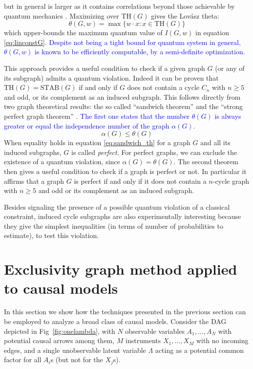 \documentclass[letterpaper]{article}
\newcommand{\STAB}{\mathrm{STAB}}
\renewcommand{\TH}{\mathrm{TH}}
\begin{document}
but in general is larger as it contains correlations beyond those achievable by quantum
mechanics \cite{almostquantum2015}.
Maximizing over $\TH(G)$ gives the Lovász theta:
\begin{equation}
    \theta(G,w) = \max \{w\cdot x : x \in \TH(G)\}
    \label{eq:lovasztheta}
\end{equation}
which upper-bounds the maximum quantum value of $I(G,w)$ in equation \eqref{eq:linconstG}.
\textcolor{blue}{
Despite not being a tight bound for quantum system in general, $\theta(G,w)$ is known to be efficiently computable, by a semi-definite optimization.
}

This approach provides a useful condition to check if a given graph $G$
(or any of its subgraph) admits a quantum violation. Indeed it can be
proven that $\TH(G) = \STAB(G)$ if and only if $G$ does not contain
a cycle $C_n$ with $n \ge 5$ and odd, or its complement as an induced
subgraph.
This follows directly from two graph theoretical results: the so called
``sandwich theorem''\cite{knuth,lovasz} and the ``strong perfect graph
theorem'' \cite{spgth}.
\textcolor{blue}{
The first one states that the number $\theta(G)$ is always greater or equal
the independence number of the graph $\alpha(G)$.}
\begin{equation}
    \alpha(G) \le \theta(G)
    \label{eq:sandwich_th}
\end{equation}
When equality holds in equation \eqref{eq:sandwich_th} for a graph $G$ and all its
induced subgraphs, $G$ is called \emph{perfect}.
For perfect graphs, we can exclude the existence of a quantum
violation, since $\alpha(G) = \theta(G)$.
The second theorem then gives a useful condition to check if a graph is perfect
or not. In particular it affirms that a graph $G$ is perfect if and only if it
does not contain a $n$-cycle graph with $n\ge5$ and odd or its complement as an
induced subgraph.

Besides signaling the presence of a possible quantum violation of a classical
constraint, induced cycle subgraphs are also experimentally interesting because
they give the simplest inequalities (in terms of number of probabilities to
estimate), to test this violation.

\section{Exclusivity graph method applied to causal models}
In this section we show how the techniques presented in the previous section can be employed to analyze
a broad class of causal models. Consider the DAG depicted in Fig~\ref{fig:onelambda}, with
$N$ observable variables $A_1, \ldots, A_N$ with potential causal arrows among them, $M$
instruments $X_1, \ldots, X_M$ with no incoming edges, and a single unobservable latent
variable $\Lambda$ acting as a potential common factor for all $A_i$s (but not for
the $X_j$s).
\end{document}
